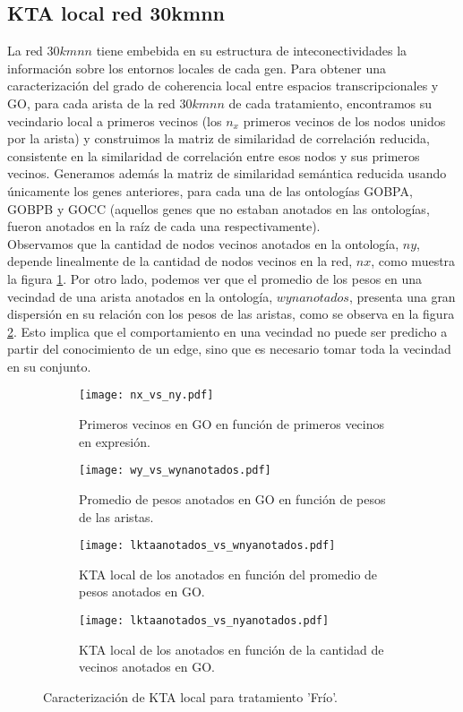 \subsection{KTA local red 30kmnn}
La red $30kmnn$ tiene embebida en su estructura de inteconectividades la información sobre los entornos locales de cada gen. Para obtener una caracterización del grado de coherencia local entre espacios transcripcionales y GO, para cada arista de la red $30kmnn$ de cada tratamiento, encontramos su vecindario local a primeros vecinos (los $n_x$ primeros vecinos de los nodos unidos por la arista) y construimos la matriz de similaridad de correlación reducida, consistente en la similaridad de correlación entre esos nodos y sus primeros vecinos. Generamos además la matriz de similaridad semántica reducida usando únicamente los genes anteriores, para cada una de las ontologías GOBPA, GOBPB y GOCC (aquellos genes que no estaban anotados en las ontologías, fueron anotados en la raíz de cada una respectivamente).\\
Observamos que la cantidad de nodos vecinos anotados en la ontología, $ny$, depende linealmente de la cantidad de nodos vecinos en la red, $nx$, como muestra la figura \ref{fig:nx_vs_ny}. Por otro lado, podemos ver que el promedio de los pesos en una vecindad de una arista anotados en la ontología, $wynanotados$, presenta una gran dispersión en su relación con los pesos de las aristas, como se observa en la figura \ref{fig:wy_vs_wynanotados}. Esto implica que el comportamiento en una vecindad no puede ser predicho a partir del conocimiento de un edge, sino que es necesario tomar toda la vecindad en su conjunto.
\begin{sidewaysfigure}[t!]
    \centering
    \begin{subfigure}[t]{0.45\textwidth}
    \centering
    \texttt{[image: nx\_vs\_ny.pdf]}
    \caption{Primeros vecinos en GO en función de primeros vecinos en expresión.}
    \label{fig:nx_vs_ny}
    \end{subfigure}    
    \begin{subfigure}[t]{0.45\textwidth}
    \centering
    \texttt{[image: wy\_vs\_wynanotados.pdf]}
    \caption{Promedio de pesos anotados en GO en función de pesos de las aristas.}
    \label{fig:wy_vs_wynanotados}
    \end{subfigure}    
    \begin{subfigure}[t]{0.45\textwidth}
    \centering
    \texttt{[image: lktaanotados\_vs\_wnyanotados.pdf]}
    \caption{KTA local de los anotados en función del promedio de pesos anotados en GO.}
    \label{fig:lktaanotados_vs_wnyanotados}
    \end{subfigure}    
    \begin{subfigure}[t]{0.45\textwidth}
    \centering
    \texttt{[image: lktaanotados\_vs\_nyanotados.pdf]}
    \caption{KTA local de los anotados en función de la cantidad de vecinos anotados en GO.}
    \label{fig:lktaanotados_vs_nyanotados}
    \end{subfigure}            
    \label{fig:ktalocal}
    \caption{Caracterización de KTA local para tratamiento 'Frío'.}
\end{sidewaysfigure}
